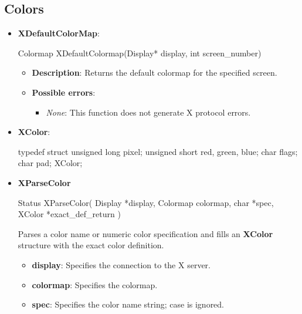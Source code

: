 \documentclass{report}
\begin{document}
    \subsection{Colors}
    \begin{itemize}
        \item \textbf{XDefaultColorMap}:
            \bigbreak \noindent 
            \begin{cppcode}
                Colormap XDefaultColormap(Display* display, int screen_number)
            \end{cppcode}
            \begin{itemize}
                \item \textbf{Description}: Returns the default colormap for the specified screen.
                \item \textbf{Possible errors}:
                    \begin{itemize}
                        \item \textit{None}: This function does not generate X protocol errors.
                    \end{itemize}
            \end{itemize}
        \item \textbf{XColor}:             
            \bigbreak \noindent 
            \begin{cppcode}
                typedef struct {
                    unsigned long pixel;
                    unsigned short red, green, blue;
                    char flags; 
                    char pad;
                } XColor;
            \end{cppcode}
        \item \textbf{XParseColor}
            \bigbreak \noindent 
            \begin{cppcode}
                Status XParseColor(
                    Display *display,
                    Colormap colormap,
                    char *spec,
                    XColor *exact_def_return
                )
            \end{cppcode}
            \bigbreak \noindent
            Parses a color name or numeric color specification and fills an \textbf{XColor} structure with the exact color definition.
            \begin{itemize}
                \item \textbf{display}: Specifies the connection to the X server.
                \item \textbf{colormap}: Specifies the colormap.
                \item \textbf{spec}: Specifies the color name string; case is ignored.

\end{itemize}
\end{itemize}
\end{document}
